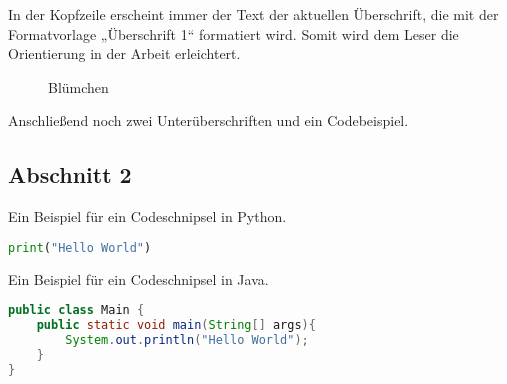 \documentclass{mi-graduation}
\begin{document}
In der Kopfzeile erscheint immer der Text der aktuellen Überschrift, die mit der Formatvorlage „Überschrift 1“ formatiert wird. Somit wird dem Leser die Orientierung in der Arbeit erleichtert.\\

\begin{figure}[h!]
	\caption{Blümchen \citep{Norman:2002}}
	\label{img:norman2010}
\end{figure}

Anschließend noch zwei Unterüberschriften und ein Codebeispiel.

\subsection{Abschnitt 2}\label{section:2}
Ein Beispiel für ein Codeschnipsel in Python.\\

\begin{lstlisting}[captionpos=b, belowcaptionskip=4pt, caption=Hello World (Python), label=helloworld, language=Python]
print("Hello World")
\end{lstlisting}

Ein Beispiel für ein Codeschnipsel in Java.\\

\begin{lstlisting}[captionpos=b, belowcaptionskip=4pt, caption=Hello World (Java), language=Java]
public class Main {
	public static void main(String[] args){
		System.out.println("Hello World");
	}
}
\end{lstlisting}

\newpage


\end{document}
